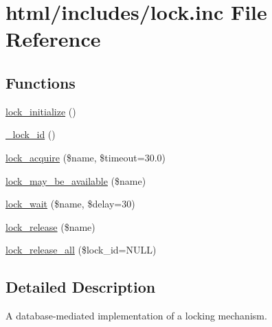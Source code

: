 \hypertarget{lock_8inc}{
\section{html/includes/lock.inc File Reference}
\label{lock_8inc}
}
\subsection*{Functions}
\begin{DoxyCompactItemize}
\item 
\hyperlink{group__lock_ga8e0cf09d86196c0a26b50df3567108a4}{lock\_\-initialize} ()
\item 
\hyperlink{group__lock_ga22f64c6b65bc54d5f8f981559b0cdf04}{\_\-lock\_\-id} ()
\item 
\hyperlink{group__lock_gac67a4b1061491f7a869646f47b66e998}{lock\_\-acquire} (\$name, \$timeout=30.0)
\item 
\hyperlink{group__lock_ga095b65838e63b109f52ff6d8c00d8963}{lock\_\-may\_\-be\_\-available} (\$name)
\item 
\hyperlink{group__lock_ga54c2ee771edac47614b8f12d949d3376}{lock\_\-wait} (\$name, \$delay=30)
\item 
\hyperlink{group__lock_ga73e1456861f9aff1a506a650f43aceb0}{lock\_\-release} (\$name)
\item 
\hyperlink{group__lock_ga290817e14e2a9ecc0bd34c6b7b0af031}{lock\_\-release\_\-all} (\$lock\_\-id=NULL)
\end{DoxyCompactItemize}


\subsection{Detailed Description}
A database-\/mediated implementation of a locking mechanism. 